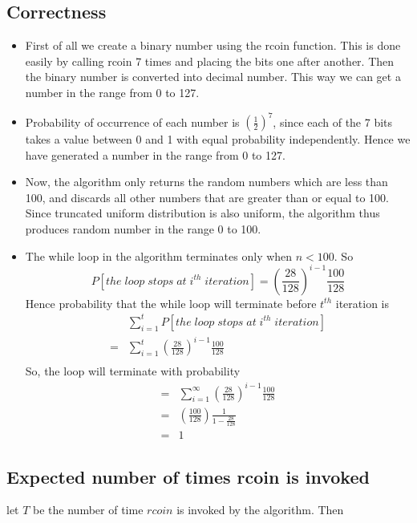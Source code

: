 \documentclass{article}
\begin{document}
\subsection{Correctness}
\begin{itemize}
\item First of all we create a binary number using the rcoin function. This is done easily by calling rcoin 7 times and placing the bits one after another. Then the binary number is converted into decimal number. This way we can get a number in the range from 0 to 127. 
\item Probability of occurrence of each number is $(\frac{1}{2})^7$, since each of the 7 bits takes a value between 0 and 1 with equal probability independently. Hence we have generated a number in the range from 0 to 127.
\item Now, the algorithm only returns the random numbers which are less than 100, and discards all other numbers that are greater than or equal to 100. Since truncated uniform distribution is also uniform, the algorithm thus produces random number in the range 0 to 100.
\item The while loop in the algorithm terminates only when $n < 100$. So 
$$P[the \;loop \;stops \;at \;i^{th} \;iteration] = \left(\frac{28}{128}\right)^{i-1} \frac{100}{128}$$
Hence probability that the while loop will terminate before $t^{th}$ iteration is
\begin{align*}
&\sum_{i=1}^t P[the \;loop \;stops \;at \;i^{th} \;iteration]\\
=&\sum_{i=1}^t \left(\frac{28}{128}\right)^{i-1} \frac{100}{128}\\
\end{align*}
So, the loop will terminate with probability
\begin{align*}
    =&\sum_{i=1}^\infty \left(\frac{28}{128}\right)^{i-1} \frac{100}{128}\\
    =&\left(\frac{100}{128}\right) \frac{1}{1 - \frac{28}{128}}\\
    =&1
\end{align*}

\end{itemize}

\subsection{Expected number of times rcoin is invoked}

let $T$ be the number of time $rcoin$ is invoked by the algorithm. Then
\end{document}
